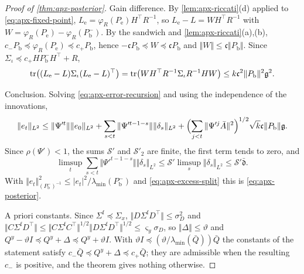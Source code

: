 \begin{proof}[Proof of \cref{thm:apx-posterior}]
Gain difference. By \cref{lem:apx-riccati}(d) applied to \cref{eq:apx-fixed-point}, $L_{\mathrm e}=\varphi_R(P_{\mathrm e})H^\top R^{-1}$, so $L_{\mathrm e}-L=WH^\top R^{-1}$ with $W=\varphi_R(P_{\mathrm e})-\varphi_R(P^-_{\mathrm b})$. By the sandwich and \cref{lem:apx-riccati}(a),(b), $c_-P_{\mathrm b}\preceq\varphi_R(P_{\mathrm e})\preceq c_+P_{\mathrm b}$, hence $-\mathfrak cP_{\mathrm b}\preceq W\preceq\mathfrak cP_{\mathrm b}$ and $\Vert W\Vert\le\mathfrak c\Vert P_{\mathrm b}\Vert$. Since $\Sigma_\iota\preceq c_+HP^-_{\mathrm b}H^\top+R$,
\begin{equation*}
\operatorname{tr}\bigl((L_{\mathrm e}-L)\Sigma_\iota(L_{\mathrm e}-L)^\top\bigr)=\operatorname{tr}\bigl(WH^\top R^{-1}\Sigma_\iota R^{-1}HW\bigr)\le k\mathfrak c^2\Vert P_{\mathrm b}\Vert^2\mathfrak g^2 .
\end{equation*}

Conclusion. Solving \cref{eq:apx-error-recursion} and using the independence of the innovations,
\begin{equation*}
\Vert e_t\Vert_{L^2}\le\Vert\Psi'^t\Vert\Vert e_0\Vert_{L^2}+\sum_{s<t}\Vert\Psi'^{t-1-s}\Vert\Vert\delta_s\Vert_{L^2}+\Bigl(\sum_{j<t}\Vert\Psi'^j\bar A\Vert^2\Bigr)^{1/2}\sqrt k\mathfrak c\Vert P_{\mathrm b}\Vert\mathfrak g .
\end{equation*}
Since $\rho(\Psi')<1$, the sums $\mathcal S'$ and $\mathcal S'_2$ are finite, the first term tends to zero, and
\begin{equation*}
\limsup_t\sum_{s<t}\Vert\Psi'^{t-1-s}\Vert\Vert\delta_s\Vert_{L^2}\le\mathcal S'\limsup_s\Vert\delta_s\Vert_{L^2}\le\mathcal S'\bar{\mathfrak d}.
\end{equation*}
With $\Vert e_t\Vert^2_{(P^-_{\mathrm b})^{-1}}\le\lvert e_t\rvert^2/\lambda_{\min}(P^-_{\mathrm b})$ and \cref{eq:apx-excess-split} this is \cref{eq:apx-posterior}.

A priori constants. Since $\Sigma^{\mathrm f}\preceq\Sigma_x$, $\Vert D\Sigma^{\mathrm f}D^\top\Vert\le\sigma_D^2$ and $\Vert C\Sigma^{\mathrm f}D^\top\Vert\le\Vert C\Sigma^{\mathrm f}C^\top\Vert^{1/2}\Vert D\Sigma^{\mathrm f}D^\top\Vert^{1/2}\le\varsigma_y\sigma_D$, so $\Vert\Delta\Vert\le\vartheta$ and $Q^y-\vartheta I\preceq Q^y+\Delta\preceq Q^y+\vartheta I$. With $\vartheta I\preceq(\vartheta/\lambda_{\min}(\bar Q))\bar Q$ the constants of the statement satisfy $c_-\bar Q\preceq Q^y+\Delta\preceq c_+\bar Q$; they are admissible when the resulting $c_-$ is positive, and the theorem gives nothing otherwise.
\end{proof}


